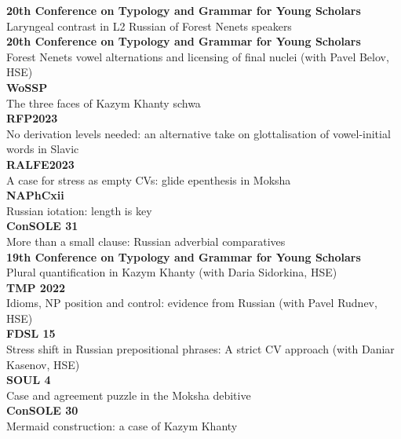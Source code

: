 \documentclass[11pt]{article} %
\begin{document}
 \textbf{20th Conference on Typology and Grammar for Young Scholars}\\ Laryngeal contrast in L2 Russian of Forest Nenets speakers \\
 \textbf{20th Conference on Typology and Grammar for Young Scholars}\\ Forest Nenets vowel alternations and licensing of final nuclei (with Pavel Belov, HSE)\\
 \textbf{WoSSP}\\ The three faces of Kazym Khanty schwa\\
 \textbf{RFP2023}\\ No derivation levels needed: an alternative take on glottalisation of vowel-initial words in Slavic\\
 \textbf{RALFE2023}\\ A case for stress as empty CVs: glide epenthesis in Moksha\\
 \textbf{NAPhCxii}\\ Russian iotation: length is key\\
 \textbf{ConSOLE 31}\\ More than a small clause: Russian adverbial comparatives\\
 \textbf{19th Conference on Typology and Grammar for Young Scholars}\\ Plural quantification in Kazym Khanty (with Daria Sidorkina, HSE)\\
 \textbf{TMP 2022} \\Idioms, NP position and control: evidence from Russian (with Pavel Rudnev, HSE)\\
 \textbf{FDSL 15} \\Stress shift in Russian prepositional phrases: A strict CV approach (with Daniar Kasenov, HSE)\\
 \textbf{SOUL 4}\\ Case and agreement puzzle in the Moksha debitive\\
 \textbf{ConSOLE 30}\\ Mermaid construction: a case of Kazym Khanty\\
\end{document}
